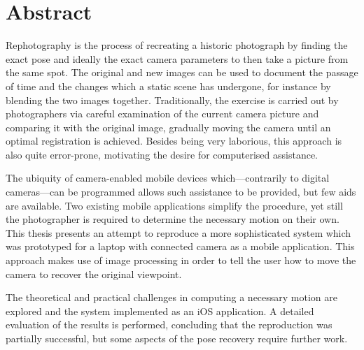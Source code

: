 \chapter*{Abstract}

Rephotography is the process of recreating a historic photograph by finding the
exact pose and ideally the exact camera parameters to then take a picture from
the same spot. The original and new images
can be used to document the passage of time and the changes which a static scene
has undergone, for instance by blending the two images together. Traditionally,
the exercise is carried out by photographers via careful examination of the
current camera picture and comparing it with the original image, gradually
moving the camera until an optimal registration is achieved. Besides being very
laborious, this approach is also quite error-prone, motivating the desire for
computerised assistance.

The ubiquity of camera-enabled mobile devices which---contrarily to digital
cameras---can be programmed allows such assistance to be provided, but few aids
are available. Two existing mobile applications simplify the procedure, yet still the
photographer is required to determine the necessary motion on their own. This
thesis presents an attempt to reproduce a more sophisticated system which was
prototyped for a laptop with connected camera as a mobile application. This
approach makes use of image processing in order to tell the user how to move the
camera to recover the original viewpoint.

The theoretical and practical challenges in computing a necessary motion are
explored and the system implemented as an iOS application. A detailed
evaluation of the results is performed, concluding that the reproduction was
partially successful, but some aspects of the pose recovery require further work.

